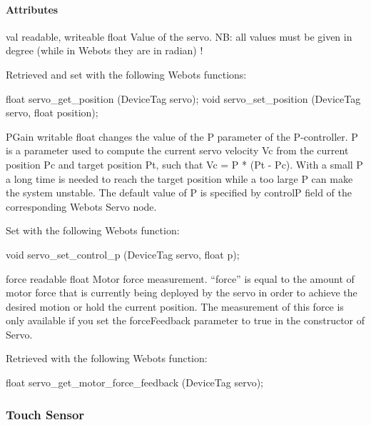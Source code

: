\paragraph{Attributes}
\noindent
\begin{itemize}
\begin{attribute}{val}
  {readable, writeable}
  {float}
  {}
  Value of the servo. NB: all values must be given in
  degree (while in Webots they are in radian) !

  Retrieved and set with the following Webots functions:
\begin{cxx}
float servo_get_position  (DeviceTag servo);
void servo_set_position  (DeviceTag servo, float position);
\end{cxx}
\end{attribute}

\begin{attribute}{PGain}
  {writable}
  {float}
  {}
  changes the value of the P parameter of the
 P-{}controller. P is a parameter used to compute the current servo
 velocity Vc from the current position Pc and target position Pt, such
 that Vc = P * (Pt -{} Pc).  With a small P a long time is needed to
 reach the target position while a too large P can make the system
 unstable.  The default value of P is specified by controlP field of
 the corresponding Webots Servo node.


 Set with the following Webots function:

\begin{cxx}
void servo_set_control_p  (DeviceTag servo, float p);
\end{cxx}
\end{attribute}

\begin{attribute}{force}
  {readable}
  {float}
  {}
  Motor force measurement. ``force'' is equal to the amount
  of motor force that is currently being deployed by the servo in order
  to achieve the desired motion or hold the current position.  The
  measurement of this force is only available if you set the
  forceFeedback parameter to true in the constructor of Servo.

  Retrieved with the following Webots function:
\begin{cxx}
float servo_get_motor_force_feedback  (DeviceTag servo);
\end{cxx}
\end{attribute}
\end{itemize}

\subsubsection{Touch Sensor}


